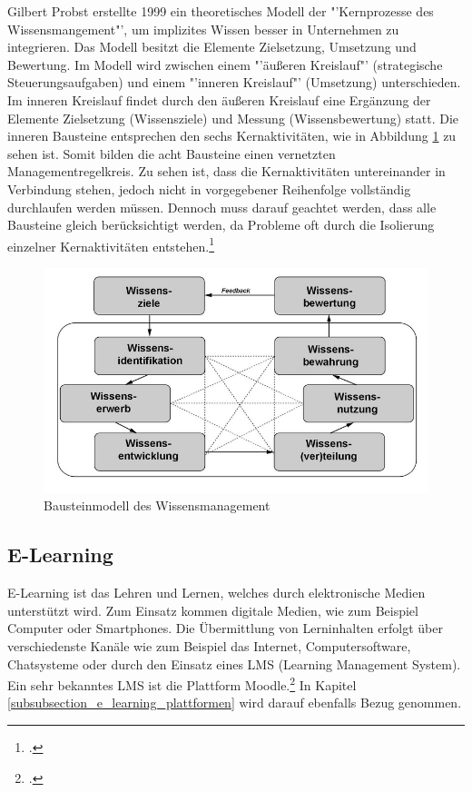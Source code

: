 Gilbert Probst erstellte 1999 ein theoretisches Modell der "'Kernprozesse des Wissensmangement"', um implizites 
Wissen besser in Unternehmen zu integrieren. Das Modell besitzt die Elemente Zielsetzung, Umsetzung und 
Bewertung. Im Modell wird zwischen einem "'äußeren Kreislauf"' (strategische Steuerungsaufgaben) und einem 
"'inneren Kreislauf"' (Umsetzung) unterschieden. Im inneren Kreislauf findet durch den äußeren Kreislauf eine 
Ergänzung der Elemente Zielsetzung (Wissensziele) und Messung (Wissensbewertung) statt. Die inneren Bausteine 
entsprechen den sechs Kernaktivitäten, wie in Abbildung \ref{fig_wissensmanagament_probst} zu sehen ist. Somit 
bilden die acht Bausteine einen vernetzten Managementregelkreis. Zu sehen ist, dass die Kernaktivitäten untereinander 
in Verbindung stehen, jedoch nicht in vorgegebener Reihenfolge vollständig durchlaufen werden müssen. Dennoch 
muss darauf geachtet werden, dass alle Bausteine gleich berücksichtigt werden, da Probleme oft durch die Isolierung 
einzelner Kernaktivitäten entstehen.\footcite[Vgl.][]{wissensmangement_enzyklopaedie-der-wirtschaftsinformatik.de_2012} 

\begin{figure}[h!]
	\centering
	\includegraphics[width=15cm]{kapitel/gruppe2/bilder/wissensmanagament_probst}
	\caption{Bausteinmodell des Wissensmanagement\protect\footnotemark}
	\label{fig_wissensmanagament_probst}
\end{figure}

\subsection{E-Learning}
\label{subsection_e-learning}
E-Learning ist das Lehren und Lernen, welches durch elektronische Medien unterstützt wird. Zum Einsatz kommen digitale Medien, wie zum Beispiel Computer oder Smartphones. Die Übermittlung von Lerninhalten erfolgt über verschiedenste Kanäle wie zum Beispiel das Internet, Computersoftware, Chatsysteme oder durch den Einsatz eines LMS (Learning Management System). Ein sehr bekanntes LMS ist die Plattform Moodle.\footcite[Vgl.][]{e-learning_team025.jimdo.com_2009} In Kapitel \ref{subsubsection_e_learning_plattformen} wird darauf ebenfalls Bezug genommen.

